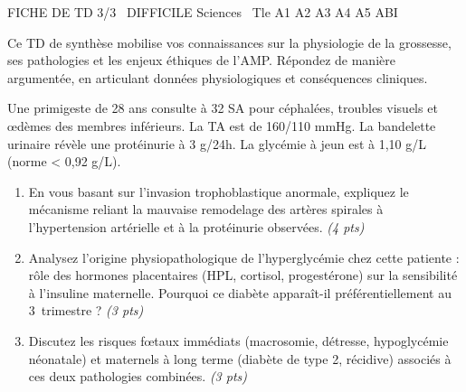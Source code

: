 \documentclass[11pt]{article}
\begin{document}
\begin{tcolorbox}[enhanced,colback=popink,colframe=popink,arc=10pt,boxrule=0pt,left=12pt,right=12pt,top=9pt,bottom=9pt]
{\color{white}\popxbold\small FICHE DE TD 3/3 \textbullet\ DIFFICILE \hfill Sciences \textbullet\ Tle A1 A2 A3 A4 A5 ABI\par}
\end{tcolorbox}
\vspace{4pt}
Ce TD de synthèse mobilise vos connaissances sur la physiologie de la grossesse, ses pathologies et les enjeux éthiques de l'AMP. Répondez de manière argumentée, en articulant données physiologiques et conséquences cliniques.

\begin{exercice}
Une primigeste de 28 ans consulte à 32 SA pour céphalées, troubles visuels et œdèmes des membres inférieurs. La TA est de 160/110 mmHg. La bandelette urinaire révèle une protéinurie à 3 g/24h. La glycémie à jeun est à 1,10 g/L (norme < 0,92 g/L).
\begin{enumerate}
    \item En vous basant sur l'invasion trophoblastique anormale, expliquez le mécanisme reliant la mauvaise remodelage des artères spirales à l'hypertension artérielle et à la protéinurie observées. \textit{(4 pts)}
    \item Analysez l'origine physiopathologique de l'hyperglycémie chez cette patiente : rôle des hormones placentaires (HPL, cortisol, progestérone) sur la sensibilité à l'insuline maternelle. Pourquoi ce diabète apparaît-il préférentiellement au 3\ieme\ trimestre ? \textit{(3 pts)}
    \item Discutez les risques fœtaux immédiats (macrosomie, détresse, hypoglycémie néonatale) et maternels à long terme (diabète de type 2, récidive) associés à ces deux pathologies combinées. \textit{(3 pts)}
\end{enumerate}
\end{exercice}
\end{document}
